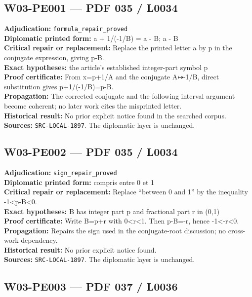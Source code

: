\documentclass[
  10pt,
  a4paper,
]{scrreprt}
\begin{document}
\subsection{W03-PE001 --- PDF 035 /
L0034}\label{w03-pe001-pdf-035-l0034}

\textbf{Adjudication:} \texttt{formula\_repair\_proved}\\
\textbf{Diplomatic printed form:} a + 1/(-1/B) = a - B; a - B\\
\textbf{Critical repair or replacement:} Replace the printed letter a by
p in the conjugate expression, giving p-B.\\
\textbf{Exact hypotheses:} the article's established integer-part symbol
p\\
\textbf{Proof certificate:} From x=p+1/A and the conjugate A↦-1/B,
direct substitution gives p+1/(-1/B)=p-B.\\
\textbf{Propagation:} The corrected conjugate and the following interval
argument become coherent; no later work cites the misprinted letter.\\
\textbf{Historical result:} No prior explicit notice found in the
searched corpus.\\
\textbf{Sources:} \texttt{SRC-LOCAL-1897}. The diplomatic layer is
unchanged.

\subsection{W03-PE002 --- PDF 035 /
L0034}\label{w03-pe002-pdf-035-l0034}

\textbf{Adjudication:} \texttt{sign\_repair\_proved}\\
\textbf{Diplomatic printed form:} compris entre 0 et 1\\
\textbf{Critical repair or replacement:} Replace ``between 0 and 1'' by
the inequality -1\textless p-B\textless0.\\
\textbf{Exact hypotheses:} B has integer part p and fractional part r in
(0,1)\\
\textbf{Proof certificate:} Write B=p+r with 0\textless r\textless1.
Then p-B=-r, hence -1\textless-r\textless0.\\
\textbf{Propagation:} Repairs the sign used in the conjugate-root
discussion; no cross-work dependency.\\
\textbf{Historical result:} No prior explicit notice found.\\
\textbf{Sources:} \texttt{SRC-LOCAL-1897}. The diplomatic layer is
unchanged.

\subsection{W03-PE003 --- PDF 037 /
L0036}\label{w03-pe003-pdf-037-l0036}
\end{document}
